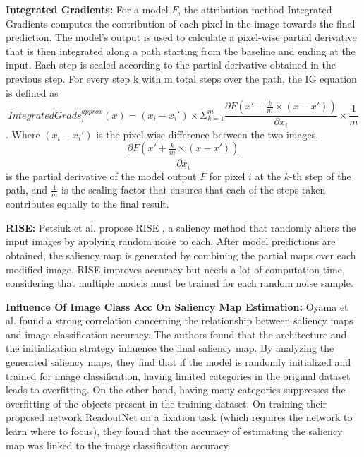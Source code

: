\textbf{Integrated Gradients: }
For a model $F$, the attribution method Integrated Gradients \cite{sundararajanAxiomaticAttributionDeep2017} computes the contribution of each pixel in the image towards the final prediction. The model's output is used to calculate a pixel-wise partial derivative that is then integrated along a path starting from the baseline and ending at the input. Each step is scaled according to the partial derivative obtained in the previous step. For every step k with m total steps over the path, the IG equation is defined as $$IntegratedGrads_i^{approx}(x) =(x_{i}-x_i')\times \Sigma_{k=1}^{m}\frac{\partial F(x' + \frac{k}{m} \times (x-x'))}{\partial x_{i}} \times \frac{1}{m}$$. Where $(x_{i} - x_{i}')$ is the pixel-wise difference between the two images, $$\frac{\partial F(x' + \frac{k}{m} \times (x-x'))}{\partial x_i}$$ is the partial derivative of the model output $F$ for pixel $i$ at the $k$-th step of the path, and $\frac{1}{m}$ is the scaling factor that ensures that each of the steps taken contributes equally to the final result.

\textbf{RISE: }
Petsiuk et al. propose RISE \cite{petsiukRISERandomizedInput2018}, a saliency method that randomly alters the input images by applying random noise to each. After model predictions are obtained, the saliency map is generated by combining the partial maps over each modified image. RISE improves accuracy but needs a lot of computation time, considering that multiple models must be trained for each random noise sample.

\textbf{Influence Of Image Class Acc On Saliency Map Estimation: }
Oyama et al. \cite{oyamaInfluenceImageClassification2018} found a strong correlation concerning the relationship between saliency maps and image classification accuracy. The authors found that the architecture and the initialization strategy influence the final saliency map. By analyzing the generated saliency maps, they find that if the model is randomly initialized and trained for image classification, having limited categories in the original dataset leads to overfitting. On the other hand, having many categories suppresses the overfitting of the objects present in the training dataset. On training their proposed network ReadoutNet on a fixation task (which requires the network to learn where to focus), they found that the accuracy of estimating the saliency map was linked to the image classification accuracy.

